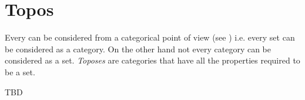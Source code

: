 \chapter{Topos}
\label{sec:topos}
Every  can be considered from a categorical point of
view (see ) i.e. every set can be
considered as a category. On the other hand not every category can be
considered as a set. \textit{Toposes} are categories that have all
the properties required to be a set. 

TBD
